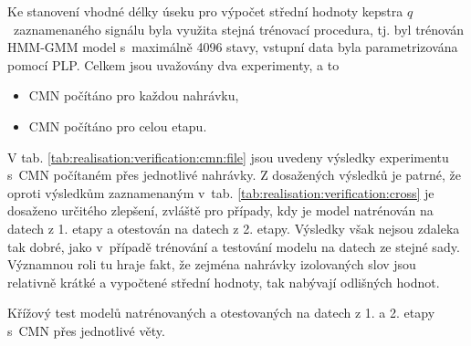 Ke stanovení vhodné délky úseku pro výpočet střední hodnoty kepstra $q$~zaznamenaného signálu byla využita stejná trénovací procedura, tj. byl
trénován HMM-GMM model s~maximálně 4096 stavy, vstupní data byla parametrizována pomocí PLP.
Celkem jsou uvažovány dva experimenty, a to

\begin{itemize}
  \item CMN počítáno pro každou nahrávku,
  \item CMN počítáno pro celou etapu.
\end{itemize}

V tab. \ref{tab:realisation:verification:cmn:file} jsou uvedeny výsledky experimentu s~CMN počítaném přes jednotlivé nahrávky.
Z dosažených výsledků je patrné, že oproti výsledkům zaznamenaným v~tab. \ref{tab:realisation:verification:cross} je dosaženo určitého zlepšení, zvláště pro případy, kdy je model natrénován na datech z 1. etapy a otestován na datech z 2. etapy.
Výsledky však nejsou zdaleka tak dobré, jako v~případě trénování a testování modelu na datech ze stejné sady.
Významnou roli tu hraje fakt, že zejména nahrávky izolovaných slov jsou relativně krátké a vypočtené střední hodnoty, tak nabývají odlišných hodnot.

\begin{table}[htpb]
  \centering
  \def\arraystretch{1.5}
  \caption[Křížový test s~CMN přes jednotlivé věty.]{Křížový test modelů natrénovaných a otestovaných na datech z 1. a 2. etapy s~CMN  přes jednotlivé věty.}
  \label{tab:realisation:verification:cmn:file}
\end{table}

